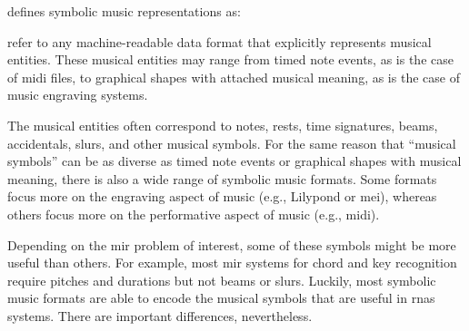 

\textcite{muller2015music} defines symbolic music
representations as:

\begin{italicquotes}
 refer to any machine-readable
data format that explicitly represents musical entities.
These musical entities may range from timed note events, as
is the case of \gls{midi} ﬁles, to graphical shapes with
attached musical meaning, as is the case of music engraving
systems.
\end{italicquotes}


The musical entities often correspond to notes, rests, time
signatures, beams, accidentals, slurs, and other musical
symbols. For the same reason that ``musical symbols'' can be
as diverse as timed note events or graphical shapes with
musical meaning, there is also a wide range of symbolic
music formats. Some formats focus more on the engraving
aspect of music (e.g., Lilypond or \gls{mei}), whereas
others focus more on the performative aspect of music (e.g.,
\gls{midi}).

Depending on the \gls{mir} problem of interest, some of
these symbols might be more useful than others. For example,
most \gls{mir} systems for chord and key recognition require
pitches and durations but not beams or slurs. Luckily, most
symbolic music formats are able to encode the musical
symbols that are useful in \glspl{rna}
systems. There are important differences, nevertheless.
